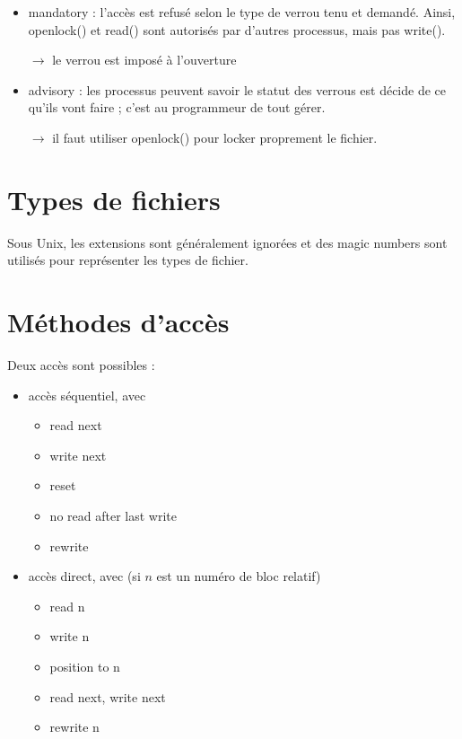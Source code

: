 	\begin{itemize}
		\item mandatory : l'accès est refusé selon le type de verrou tenu et demandé. Ainsi, openlock() et read() sont autorisés par d'autres processus, mais pas write().
		\item[$\rightarrow$] le verrou est imposé à l'ouverture
		\item advisory : les processus peuvent savoir le statut des verrous est décide de ce qu'ils vont faire ; c'est au programmeur de tout gérer.
		\item[$\rightarrow$] il faut utiliser openlock() pour locker proprement le fichier.
	\end{itemize}
	
	
\section{Types de fichiers}


Sous Unix, les extensions sont généralement ignorées et des magic numbers sont utilisés pour représenter les types de fichier.


\section{Méthodes d'accès}

Deux accès sont possibles :

\begin{itemize}
	\item accès séquentiel, avec
	
	\begin{itemize}
		\item read next
		\item write next
		\item reset
		\item no read after last write
		\item rewrite
	\end{itemize}
	
	
	\item accès direct, avec (si $n$ est un numéro de bloc relatif)
	\begin{itemize}
		\item read n
		\item write n
		\item position to n
		\item read next, write next
		\item rewrite n
	\end{itemize}
\end{itemize}

